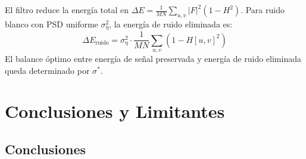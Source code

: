 \documentclass[conference]{IEEEtran}
\begin{document}
El filtro reduce la energía total en $\Delta E = \frac{1}{MN}\sum_{u,v}|F|^2(1-H^2)$.
Para ruido blanco con PSD uniforme $\sigma_\eta^2$, la energía de ruido
eliminada es:
\begin{equation}
  \Delta E_{\text{ruido}} = \sigma_\eta^2\cdot\frac{1}{MN}
  \sum_{u,v}(1 - H[u,v]^2)
  \label{eq:energia_ruido_elim}
\end{equation}
El balance óptimo entre energía de señal preservada y energía de ruido
eliminada queda determinado por $\sigma^*$.

\section{Conclusiones y Limitantes}
\label{sec:conclusiones}

\subsection{Conclusiones}
\end{document}
